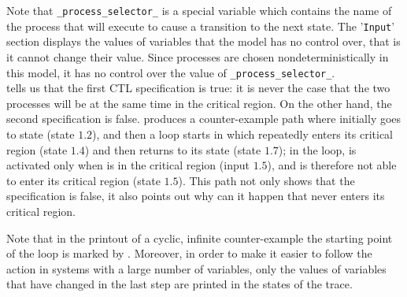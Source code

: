 Note that \texttt{\_process\_selector\_} is a special variable which
contains the name of the process that will execute to cause a
transition to the next state. The '\texttt{Input}' section displays
the values of variables that the model has no control over, that is it
cannot change their value. Since processes are chosen
nondeterministically in this model, it has no control over the value
of \texttt{\_process\_selector\_}.\\
\nusmv tells us that the first CTL specification is true:
it is never the case that the two processes will be at the same time in
the critical region.
On the other hand, the second specification is false. \nusmv
produces a counter-example path where initially  goes to
state  (state $1.2$), and then a loop starts in which
 repeatedly enters its critical region (state $1.4$) and then
returns to its  state (state $1.7$); in the loop, 
is activated only when  is in the critical region (input $1.5$), and is
therefore not able to enter its critical region (state $1.5$). This path
not only shows that the specification is false, it also points out why
can it happen that  never enters its critical region.

Note that in the printout of a cyclic, infinite counter-example the
starting point of the loop is marked by .
Moreover, in order to make it easier to follow the action in systems
with a large number of variables, only the values of variables that have
changed in the last step are printed in the states of the trace.
